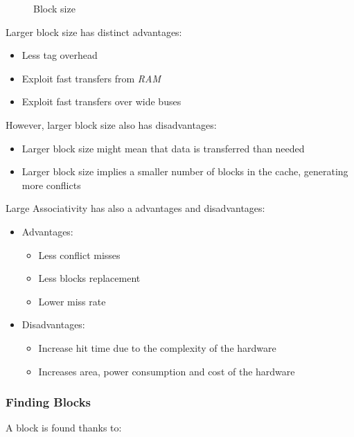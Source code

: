 \documentclass[english]{article}
\begin{document}
\begin{figure}
  \bigskip
  \centering
  \caption{Block size}
  \label{fig:block-size}
  \bigskip
\end{figure}

Larger block size has distinct advantages:

\begin{itemize}
  \item Less tag overhead
  \item Exploit fast transfers from \textit{RAM}
  \item Exploit fast transfers over wide buses
\end{itemize}

However, larger block size also has disadvantages:

\begin{itemize}
  \item Larger block size might mean that data is transferred than needed
  \item Larger block size implies a smaller number of blocks in the cache, generating more conflicts
\end{itemize}

Large Associativity has also a advantages and disadvantages:

\begin{itemize}
  \item Advantages:
        \begin{itemize}
          \item Less conflict misses
          \item Less blocks replacement
          \item Lower miss rate
        \end{itemize}
  \item Disadvantages:
        \begin{itemize}
          \item Increase hit time due to the complexity of the hardware
          \item Increases area, power consumption and cost of the hardware
        \end{itemize}
\end{itemize}

\subsubsection{Finding Blocks}

A block is found thanks to:
\end{document}
